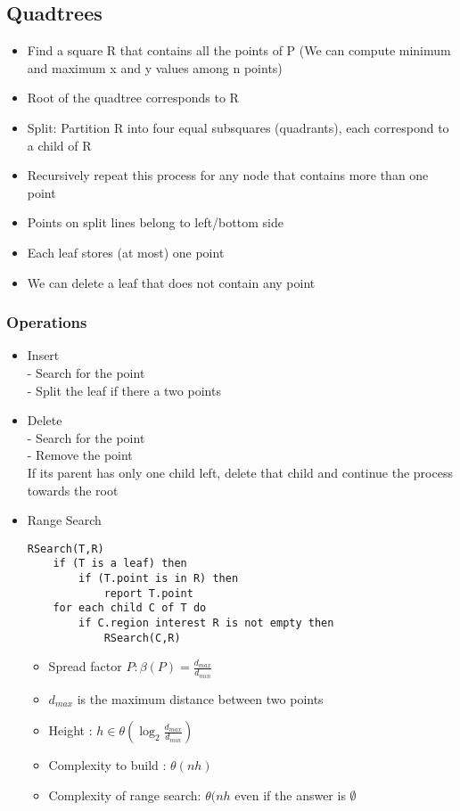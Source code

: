 \documentclass{article}
\begin{document}
\subsection*{Quadtrees}
\begin{itemize}
\item Find a square R that contains all the points of P (We can compute
minimum and maximum x and y values among n points)
\item  Root of the quadtree corresponds to R
\item Split: Partition R into four equal subsquares (quadrants), each
correspond to a child of R
\item Recursively repeat this process for any node that contains more than one point
\item Points on split lines belong to left/bottom side
\item Each leaf stores (at most) one point
\item We can delete a leaf that does not contain any point
\end{itemize}

\subsubsection*{Operations}
\begin{itemize}
\item Insert \\
- Search for the point \\
- Split the leaf if there a two points
\item Delete \\
- Search for the point \\
- Remove the point \\
If its parent has only one child left, delete that child and continue the process towards the root
\item Range Search 
\begin{lstlisting}
RSearch(T,R)
	if (T is a leaf) then 
		if (T.point is in R) then 
			report T.point 
	for each child C of T do 
		if C.region interest R is not empty then 
			RSearch(C,R)
\end{lstlisting}
\begin{itemize}
\item Spread factor \( P : \beta(P) = \frac{d_{max}}{d_{min}}\)
\item \(d_{max}\) is the maximum distance between two points
\item Height : \(h \in \theta(\log_2 \frac{d_{max}}{d_{min}})\)
\item Complexity to build : \(\theta (nh)\)
\item Complexity of range search: \(\theta(nh\) even if the answer is \(\emptyset\)
\end{itemize}
\end{itemize}
\end{document}
